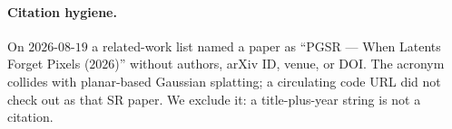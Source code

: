 \paragraph{Citation hygiene.}
On $2026$-$08$-$19$ a related-work list named a paper as
``PGSR --- When Latents Forget Pixels ($2026$)'' without authors,
arXiv ID, venue, or DOI.
The acronym collides with planar-based Gaussian splatting; a
circulating code URL did not check out as that SR paper.
We exclude it: a title-plus-year string is not a citation.
